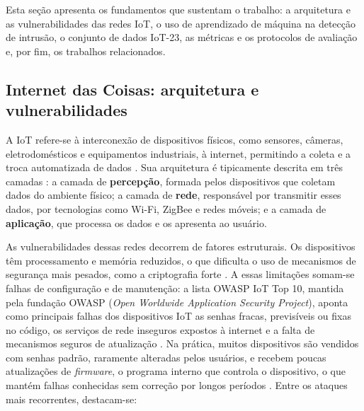\documentclass[alpha-refs,brazilian]{CC-EC_TF-TC}
\begin{document}
Esta seção apresenta os fundamentos que sustentam o trabalho: a arquitetura e as vulnerabilidades das redes IoT, o uso de aprendizado de máquina na detecção de intrusão, o conjunto de dados IoT-23, as métricas e os protocolos de avaliação e, por fim, os trabalhos relacionados.

\subsection{Internet das Coisas: arquitetura e vulnerabilidades}

A IoT refere-se à interconexão de dispositivos físicos, como sensores, câmeras, eletrodomésticos e equipamentos industriais, à internet, permitindo a coleta e a troca automatizada de dados \citep{alfahaid2025survey}. Sua arquitetura é tipicamente descrita em três camadas \citep{mrabet2020survey}: a camada de \textbf{percepção}, formada pelos dispositivos que coletam dados do ambiente físico; a camada de \textbf{rede}, responsável por transmitir esses dados, por tecnologias como Wi-Fi, ZigBee e redes móveis; e a camada de \textbf{aplicação}, que processa os dados e os apresenta ao usuário.

As vulnerabilidades dessas redes decorrem de fatores estruturais. Os dispositivos têm processamento e memória reduzidos, o que dificulta o uso de mecanismos de segurança mais pesados, como a criptografia forte \citep{mrabet2020survey}. A essas limitações somam-se falhas de configuração e de manutenção: a lista OWASP IoT Top 10, mantida pela fundação OWASP (\textit{Open Worldwide Application Security Project}), aponta como principais falhas dos dispositivos IoT as senhas fracas, previsíveis ou fixas no código, os serviços de rede inseguros expostos à internet e a falta de mecanismos seguros de atualização \citep{owasp2018iot}. Na prática, muitos dispositivos são vendidos com senhas padrão, raramente alteradas pelos usuários, e recebem poucas atualizações de \textit{firmware}, o programa interno que controla o dispositivo, o que mantém falhas conhecidas sem correção por longos períodos \citep{alfahaid2025survey}. Entre os ataques mais recorrentes, destacam-se:
\end{document}
